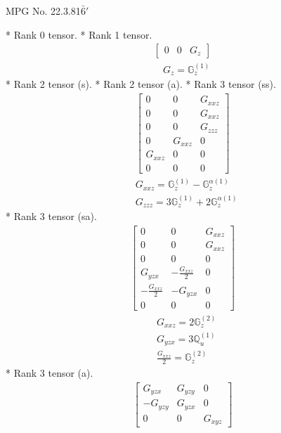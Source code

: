 \documentclass[fleqn,8pt,landscape]{jsarticle}
\begin{document}
\setcounter{MaxMatrixCols}{32}

\renewcommand{\tablename}{Table~}
\renewcommand{\figurename}{Figure~}
\begin{center}
\LARGE
MPG No. 22.3.81\quad$\bar{6}'$
\end{center}
* Rank 0 tensor.
* Rank 1 tensor.
\begin{align*}
\begin{bmatrix} 0 & 0 & G_{z} \end{bmatrix}
\end{align*}
\begin{align*}
& G_{z} = \mathbb{G}_{z}^{(1)}
\end{align*}
* Rank 2 tensor (s).
* Rank 2 tensor (a).
* Rank 3 tensor (ss).
\begin{align*}
\begin{bmatrix} 0 & 0 & G_{xxz} \\ 0 & 0 & G_{xxz} \\ 0 & 0 & G_{zzz} \\ 0 & G_{xxz} & 0 \\ G_{xxz} & 0 & 0 \\ 0 & 0 & 0 \end{bmatrix}
\end{align*}
\begin{align*}
& G_{xxz} = \mathbb{G}_{z}^{(1)} - \mathbb{G}_{z}^{\alpha(1)} \\
& G_{zzz} = 3 \mathbb{G}_{z}^{(1)} + 2 \mathbb{G}_{z}^{\alpha(1)}
\end{align*}
* Rank 3 tensor (sa).
\begin{align*}
\begin{bmatrix} 0 & 0 & G_{xxz} \\ 0 & 0 & G_{xxz} \\ 0 & 0 & 0 \\ G_{yzx} & - \frac{G_{xxz}}{2} & 0 \\ - \frac{G_{xxz}}{2} & - G_{yzx} & 0 \\ 0 & 0 & 0 \end{bmatrix}
\end{align*}
\begin{align*}
& G_{xxz} = 2 \mathbb{G}_{z}^{(2)} \\
& G_{yzx} = 3 \mathbb{Q}_{u}^{(1)} \\
& \frac{G_{xxz}}{2} = \mathbb{G}_{z}^{(2)}
\end{align*}
* Rank 3 tensor (a).
\begin{align*}
\begin{bmatrix} G_{yzx} & G_{yzy} & 0 \\ - G_{yzy} & G_{yzx} & 0 \\ 0 & 0 & G_{xyz} \end{bmatrix}
\end{align*}
\end{document}
